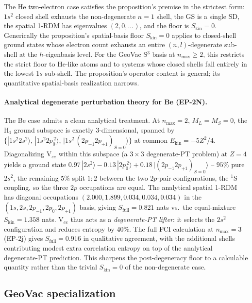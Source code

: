 \documentclass[twocolumn,pra,amsmath,amssymb,superscriptaddress]{revtex4-2}
\begin{document}
The He two-electron case satisfies the proposition's premise
in the strictest form: $1s^{2}$ closed shell exhausts the
non-degenerate $n=1$ shell, the GS is a single SD, the
spatial 1-RDM has eigenvalues $(2, 0, \ldots)$, and the
floor is $S_{\mathrm{kin}}=0$.  Generically the
proposition's spatial-basis floor $S_{\mathrm{kin}}=0$
applies to closed-shell ground states whose electron count
exhausts an entire $(n,l)$-degenerate sub-shell at the
$h$-eigenbasis level.  For the GeoVac S$^{3}$ basis at
$n_{\max}\geq 2$, this restricts the strict floor to
He-like atoms and to systems whose closed shells fall
entirely in the lowest $1s$ sub-shell.  The proposition's
operator content is general; its quantitative spatial-basis
realization narrows.

\paragraph*{Analytical degenerate perturbation theory for Be
(EP-2N).}  The Be case admits a clean analytical treatment.
At $n_{\max}=2$, $M_L=M_S=0$, the H$_1$ ground subspace
is exactly $3$-dimensional, spanned by
$\{|1s^{2}2s^{2}\rangle,\, |1s^{2}2p_{0}^{\,2}\rangle,\,
|1s^{2}\,(2p_{-1}2p_{+1})_{S=0}\rangle\}$ at common
$E_{\mathrm{kin}} = -5Z^{2}/4$.  Diagonalizing V$_{ee}$ within
this subspace (a $3\times 3$ degenerate-PT problem) at $Z=4$
yields a ground state $0.97\,|2s^{2}\rangle - 0.13\,|2p_{0}^{\,2}\rangle
+ 0.18\,|(2p_{-1}2p_{+1})_{S=0}\rangle$ -- $95\%$ pure
$2s^{2}$, the remaining $5\%$ split $1:2$ between the two
$2p$-pair configurations, the $^{1}$S coupling, so the three
$2p$ occupations are equal.  The analytical spatial 1-RDM has
diagonal occupations $(2.000, 1.899, 0.034, 0.034, 0.034)$ in
the $(1s, 2s, 2p_{-1}, 2p_{0}, 2p_{+1})$ basis, giving
$S_{\mathrm{full}} = 0.821$ nats vs.\ the equal-mixture
$S_{\mathrm{kin}} = 1.358$ nats.  V$_{ee}$ thus acts as a
\emph{degenerate-PT lifter}: it selects the $2s^{2}$
configuration and reduces entropy by $40\%$.  The full FCI
calculation at $n_{\max}=3$ (EP-2j) gives $S_{\mathrm{full}}
= 0.916$ in qualitative agreement, with the additional
shells contributing modest extra correlation entropy on top of
the analytical degenerate-PT prediction.  This sharpens the
post-degeneracy floor to a calculable quantity rather than
the trivial $S_{\mathrm{kin}}=0$ of the non-degenerate case.

\subsection{GeoVac specialization}
\end{document}
